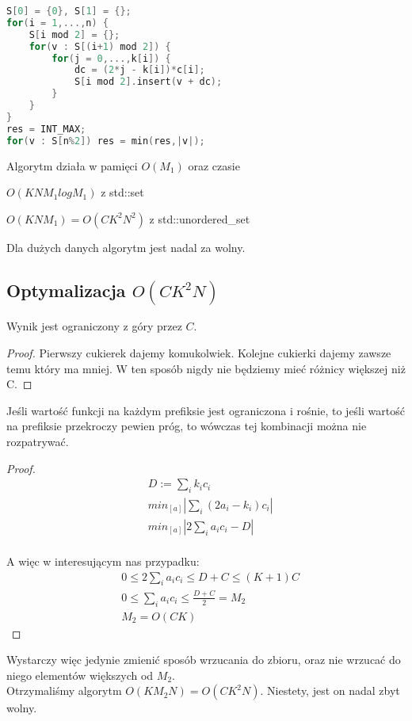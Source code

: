 \documentclass[paper=a4, fontsize=11pt]{article}
\begin{document}
\begin{lstlisting}[language=c++]
S[0] = {0}, S[1] = {};
for(i = 1,...,n) {
	S[i mod 2] = {};
	for(v : S[(i+1) mod 2]) {
		for(j = 0,...,k[i]) {
			dc = (2*j - k[i])*c[i];
			S[i mod 2].insert(v + dc);
		}
	}
}
res = INT_MAX;
for(v : S[n%2]) res = min(res,|v|);
\end{lstlisting}
Algorytm działa w pamięci $O(M_1)$ oraz czasie
\begin{description}
	\item $O(KNM_1logM_1)$ z std::set
	\item $O(KNM_1) = O(CK^2N^2)$ z std::unordered\_set 
\end{description}
Dla dużych danych algorytm jest nadal za wolny.

\subsection{Optymalizacja $O(CK^2N)$}
\begin{lemma} Wynik jest ograniczony z góry przez $C$.
\begin{proof}
Pierwszy cukierek dajemy komukolwiek. Kolejne cukierki dajemy zawsze temu który ma mniej. W ten sposób nigdy nie będziemy mieć różnicy większej niż C.
\end{proof}

\end{lemma}
\begin{lemma} Jeśli wartość funkcji na każdym prefiksie jest ograniczona i rośnie, to jeśli wartość na prefiksie przekroczy pewien próg, to wówczas tej kombinacji można nie rozpatrywać.
\begin{proof}
\begin{align*}
&D:= \sum_i k_i c_i \\
&min_{[a]} |\sum_i (2a_i - k_i) c_i| \\
&min_{[a]} |2\sum_i a_i c_i - D| \\
\end{align*}

A więc w interesującym nas przypadku:
\begin{align*}	
& 0 \leq 2\sum_i a_ic_i \leq D + C \leq (K+1)C  \\
& 0 \leq \sum_i a_ic_i \leq \frac{D+C}{2} = M_2 \\
& M_2 = O(CK)
\end{align*}
\end{proof}
\end{lemma}
\begin{displaymath}
\end{displaymath}
Wystarczy więc jedynie zmienić sposób wrzucania do zbioru, oraz nie wrzucać do niego elementów większych od $M_2$. \\
Otrzymaliśmy algorytm $O(KM_2N) = O(CK^2N)$. Niestety, jest on nadal zbyt wolny.
\end{document}
